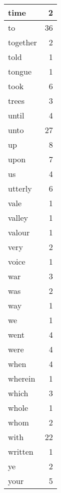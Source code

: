 \begin{center}
\begin{longtable}{l|r}
time & 2 \\ \hline
to & 36 \\ \hline
together & 2 \\ \hline
told & 1 \\ \hline
tongue & 1 \\ \hline
took & 6 \\ \hline
trees & 3 \\ \hline
until & 4 \\ \hline
unto & 27 \\ \hline
up & 8 \\ \hline
upon & 7 \\ \hline
us & 4 \\ \hline
utterly & 6 \\ \hline
vale & 1 \\ \hline
valley & 1 \\ \hline
valour & 1 \\ \hline
very & 2 \\ \hline
voice & 1 \\ \hline
war & 3 \\ \hline
was & 2 \\ \hline
way & 1 \\ \hline
we & 1 \\ \hline
went & 4 \\ \hline
were & 4 \\ \hline
when & 4 \\ \hline
wherein & 1 \\ \hline
which & 3 \\ \hline
whole & 1 \\ \hline
whom & 2 \\ \hline
with & 22 \\ \hline
written & 1 \\ \hline
ye & 2 \\ \hline
your & 5 \\ \hline
\end{longtable}
\end{center}



\normalsize



